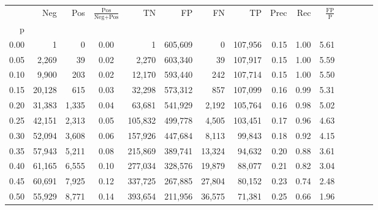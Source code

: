 \begin{tabular}{rrrcrrrrrrrrrrr}
\toprule
{} &     Neg &    Pos & $\frac{\text{Pos}}{\text{Neg}+\text{Pos}}$ &       TN &       FP &       FN &       TP &  Prec &   Rec & $\frac{\text{FP}}{\text{P}}$ \\
p    &         &        &                                            &          &          &          &          &       &       &                              \\
\midrule
0.00 &       1 &      0 &                                       0.00 &        1 &  605,609 &        0 &  107,956 &  0.15 &  1.00 &                         5.61 \\
0.05 &   2,269 &     39 &                                       0.02 &    2,270 &  603,340 &       39 &  107,917 &  0.15 &  1.00 &                         5.59 \\
0.10 &   9,900 &    203 &                                       0.02 &   12,170 &  593,440 &      242 &  107,714 &  0.15 &  1.00 &                         5.50 \\
0.15 &  20,128 &    615 &                                       0.03 &   32,298 &  573,312 &      857 &  107,099 &  0.16 &  0.99 &                         5.31 \\
0.20 &  31,383 &  1,335 &                                       0.04 &   63,681 &  541,929 &    2,192 &  105,764 &  0.16 &  0.98 &                         5.02 \\
0.25 &  42,151 &  2,313 &                                       0.05 &  105,832 &  499,778 &    4,505 &  103,451 &  0.17 &  0.96 &                         4.63 \\
0.30 &  52,094 &  3,608 &                                       0.06 &  157,926 &  447,684 &    8,113 &   99,843 &  0.18 &  0.92 &                         4.15 \\
0.35 &  57,943 &  5,211 &                                       0.08 &  215,869 &  389,741 &   13,324 &   94,632 &  0.20 &  0.88 &                         3.61 \\
0.40 &  61,165 &  6,555 &                                       0.10 &  277,034 &  328,576 &   19,879 &   88,077 &  0.21 &  0.82 &                         3.04 \\
0.45 &  60,691 &  7,925 &                                       0.12 &  337,725 &  267,885 &   27,804 &   80,152 &  0.23 &  0.74 &                         2.48 \\
0.50 &  55,929 &  8,771 &                                       0.14 &  393,654 &  211,956 &   36,575 &   71,381 &  0.25 &  0.66 &                         1.96 \\

\end{tabular}
